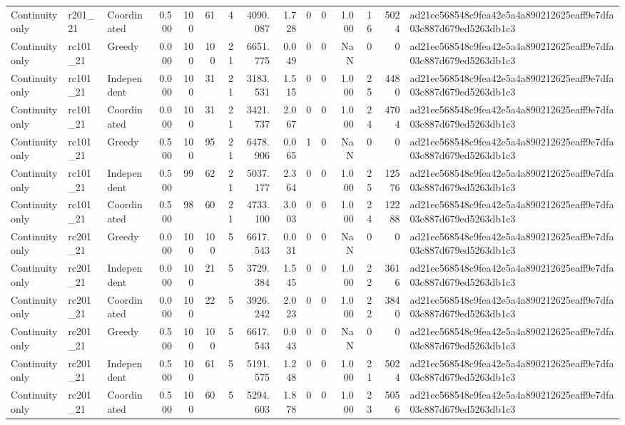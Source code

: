 \begin{tabular}{lllrrrrrrrrrrrl}
Continuity only & r201\_21 & Coordinated & 0.500 & 100 & 61 & 4 & 4090.087 & 1.728 & 0 & 0 & 1.000 & 16 & 5024 & ad21ec568548c9fea42e5a4a890212625eaff9e7dfa03c887d679ed5263db1c3 \\
Continuity only & rc101\_21 & Greedy & 0.000 & 100 & 100 & 21 & 6651.775 & 0.049 & 0 & 0 & NaN & 0 & 0 & ad21ec568548c9fea42e5a4a890212625eaff9e7dfa03c887d679ed5263db1c3 \\
Continuity only & rc101\_21 & Independent & 0.000 & 100 & 31 & 21 & 3183.531 & 1.515 & 0 & 0 & 1.000 & 25 & 4480 & ad21ec568548c9fea42e5a4a890212625eaff9e7dfa03c887d679ed5263db1c3 \\
Continuity only & rc101\_21 & Coordinated & 0.000 & 100 & 31 & 21 & 3421.737 & 2.067 & 0 & 0 & 1.000 & 24 & 4704 & ad21ec568548c9fea42e5a4a890212625eaff9e7dfa03c887d679ed5263db1c3 \\
Continuity only & rc101\_21 & Greedy & 0.500 & 100 & 95 & 21 & 6478.906 & 0.065 & 1 & 0 & NaN & 0 & 0 & ad21ec568548c9fea42e5a4a890212625eaff9e7dfa03c887d679ed5263db1c3 \\
Continuity only & rc101\_21 & Independent & 0.500 & 99 & 62 & 21 & 5037.177 & 2.364 & 0 & 0 & 1.000 & 25 & 12576 & ad21ec568548c9fea42e5a4a890212625eaff9e7dfa03c887d679ed5263db1c3 \\
Continuity only & rc101\_21 & Coordinated & 0.500 & 98 & 60 & 21 & 4733.100 & 3.003 & 0 & 0 & 1.000 & 24 & 12288 & ad21ec568548c9fea42e5a4a890212625eaff9e7dfa03c887d679ed5263db1c3 \\
Continuity only & rc201\_21 & Greedy & 0.000 & 100 & 100 & 5 & 6617.543 & 0.031 & 0 & 0 & NaN & 0 & 0 & ad21ec568548c9fea42e5a4a890212625eaff9e7dfa03c887d679ed5263db1c3 \\
Continuity only & rc201\_21 & Independent & 0.000 & 100 & 21 & 5 & 3729.384 & 1.545 & 0 & 0 & 1.000 & 22 & 3616 & ad21ec568548c9fea42e5a4a890212625eaff9e7dfa03c887d679ed5263db1c3 \\
Continuity only & rc201\_21 & Coordinated & 0.000 & 100 & 22 & 5 & 3926.242 & 2.023 & 0 & 0 & 1.000 & 22 & 3840 & ad21ec568548c9fea42e5a4a890212625eaff9e7dfa03c887d679ed5263db1c3 \\
Continuity only & rc201\_21 & Greedy & 0.500 & 100 & 100 & 5 & 6617.543 & 0.043 & 0 & 0 & NaN & 0 & 0 & ad21ec568548c9fea42e5a4a890212625eaff9e7dfa03c887d679ed5263db1c3 \\
Continuity only & rc201\_21 & Independent & 0.500 & 100 & 61 & 5 & 5191.575 & 1.248 & 0 & 0 & 1.000 & 21 & 5024 & ad21ec568548c9fea42e5a4a890212625eaff9e7dfa03c887d679ed5263db1c3 \\
Continuity only & rc201\_21 & Coordinated & 0.500 & 100 & 60 & 5 & 5294.603 & 1.878 & 0 & 0 & 1.000 & 23 & 5056 & ad21ec568548c9fea42e5a4a890212625eaff9e7dfa03c887d679ed5263db1c3 \\
\bottomrule
\end{tabular}
